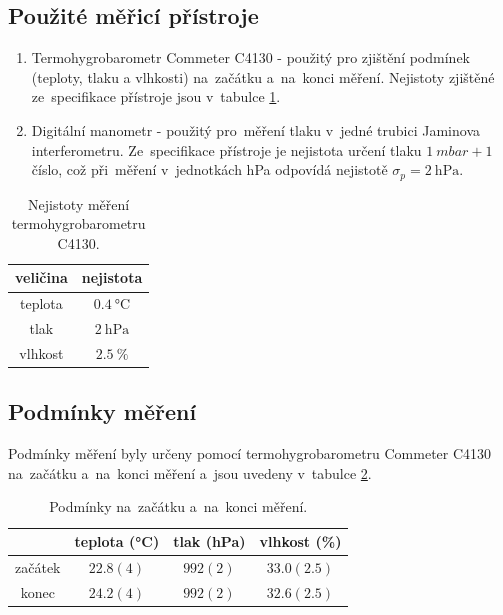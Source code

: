 \documentclass{../concepts/titul_zprava_p/prepareprotokolZprava} %
\begin{document}
\subsection{Použité měřicí přístroje}
\begin{enumerate}
    \item Termohygrobarometr Commeter C4130 - použitý pro zjištění podmínek (teploty, tlaku a vlhkosti) na~začátku a~na~konci měření.
    Nejistoty zjištěné ze~specifikace přístroje jsou v~tabulce \ref{tab:pristroje}.
    \item Digitální manometr - použitý pro~měření tlaku v~jedné trubici Jaminova interferometru. Ze~specifikace přístroje
    je nejistota určení tlaku $\qty{1}{mbar} + 1$ \!číslo, což při~měření v~jednotkách \unit{\hecto\pascal} odpovídá
    nejistotě $\sigma_p = \qty{2}{\hecto\pascal}$.

\end{enumerate}

\begin{table}[!htbp]
    \centering
    \caption{Nejistoty měření termohygrobarometru C4130.}
    \begin{tabular}{|c|c|}
        \hline
        veličina & nejistota \\
        \hline
        teplota & $\qty{0.4}{\degreeCelsius}$  \\
        tlak & $\qty{2}{\hecto\pascal}$ \\
        vlhkost & $\qty{2.5}{\%}$ \\
        \hline
    \end{tabular}
    \label{tab:pristroje}
\end{table}

\subsection{Podmínky měření}
Podmínky měření byly určeny pomocí termohygrobarometru Commeter C4130 na~začátku a~na~konci měření a~jsou uvedeny 
v~tabulce \ref{tab:podminky}.

\begin{table}[!htbp]
    \centering
    \caption{Podmínky na~začátku a~na~konci měření.}
    \begin{tabular}{|c|c|c|c|}
        \hline
         & teplota (\unit{\degreeCelsius}) & tlak (\unit{\hecto\pascal}) & vlhkost (\%) \\
        \hline
        začátek & $22.8(4)$ & $992(2)$ & $33.0(2.5)$ \\
        konec & $24.2(4)$ & $992(2)$ & $32.6(2.5)$ \\
        \hline
    \end{tabular}
    \label{tab:podminky}
\end{table}
\end{document}
